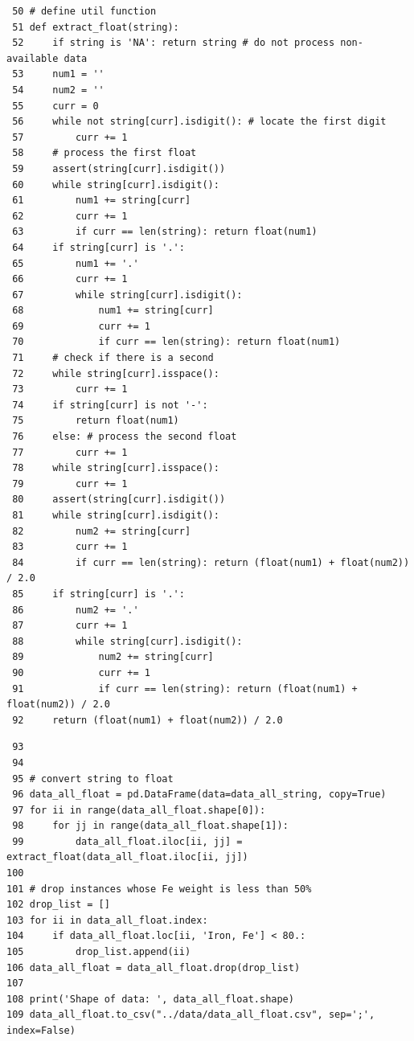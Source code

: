 \documentclass[10pt,aps,prb,amsmath,amssymb,twocolumn,letterpaper,nobalancelastpage,final,citeautoscript,floatfix,raggedbottom,superscriptaddress]{revtex4-1}
\begin{document}
\begin{lstlisting}
 50 # define util function
 51 def extract_float(string):
 52     if string is 'NA': return string # do not process non-available data
 53     num1 = ''
 54     num2 = ''
 55     curr = 0
 56     while not string[curr].isdigit(): # locate the first digit
 57         curr += 1
 58     # process the first float
 59     assert(string[curr].isdigit())
 60     while string[curr].isdigit():
 61         num1 += string[curr]
 62         curr += 1
 63         if curr == len(string): return float(num1)
 64     if string[curr] is '.':
 65         num1 += '.'
 66         curr += 1
 67         while string[curr].isdigit():
 68             num1 += string[curr]
 69             curr += 1
 70             if curr == len(string): return float(num1)
 71     # check if there is a second
 72     while string[curr].isspace():
 73         curr += 1
 74     if string[curr] is not '-':
 75         return float(num1)
 76     else: # process the second float
 77         curr += 1
 78     while string[curr].isspace():
 79         curr += 1
 80     assert(string[curr].isdigit())
 81     while string[curr].isdigit():
 82         num2 += string[curr]
 83         curr += 1
 84         if curr == len(string): return (float(num1) + float(num2)) / 2.0
 85     if string[curr] is '.':
 86         num2 += '.'
 87         curr += 1
 88         while string[curr].isdigit():
 89             num2 += string[curr]
 90             curr += 1
 91             if curr == len(string): return (float(num1) + float(num2)) / 2.0
 92     return (float(num1) + float(num2)) / 2.0
\end{lstlisting}
\clearpage
\begin{lstlisting}
 93 
 94 
 95 # convert string to float
 96 data_all_float = pd.DataFrame(data=data_all_string, copy=True)
 97 for ii in range(data_all_float.shape[0]):
 98     for jj in range(data_all_float.shape[1]):
 99         data_all_float.iloc[ii, jj] = extract_float(data_all_float.iloc[ii, jj])
100 
101 # drop instances whose Fe weight is less than 50%
102 drop_list = []
103 for ii in data_all_float.index:
104     if data_all_float.loc[ii, 'Iron, Fe'] < 80.:
105         drop_list.append(ii)
106 data_all_float = data_all_float.drop(drop_list)
107 
108 print('Shape of data: ', data_all_float.shape)
109 data_all_float.to_csv("../data/data_all_float.csv", sep=';', index=False)
\end{lstlisting}
\end{document}
